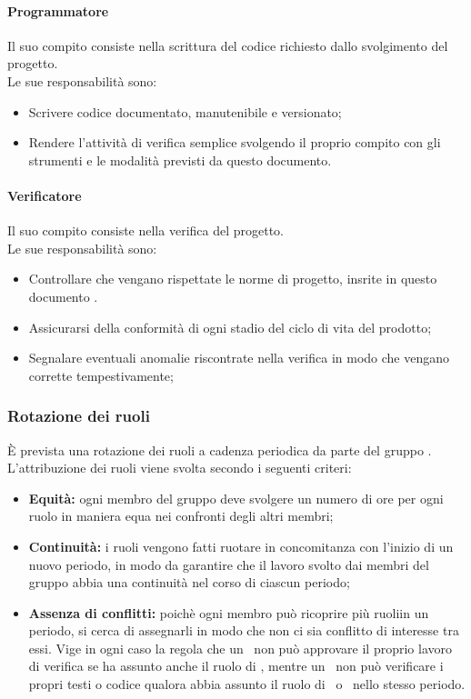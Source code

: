       \paragraph{Programmatore}
        Il suo compito consiste nella scrittura del codice richiesto dallo svolgimento del progetto.\\
        Le sue responsabilità sono:
        \begin{itemize}
          \item Scrivere codice documentato, manutenibile e versionato;
          \item Rendere l'attività di verifica semplice svolgendo il proprio compito con gli strumenti e le modalità previsti da questo documento.
        \end{itemize}

      \paragraph{Verificatore}
        Il suo compito consiste nella verifica del progetto.\\
        Le sue responsabilità sono:
        \begin{itemize}
          \item Controllare che vengano rispettate le norme di progetto, insrite in questo documento \docNameVersionNdP.
          \item Assicurarsi della conformità di ogni stadio del ciclo di vita del prodotto;
          \item Segnalare eventuali anomalie riscontrate nella verifica in modo che vengano corrette tempestivamente;
        \end{itemize}

    \subsubsection{Rotazione dei ruoli}
      È prevista una rotazione dei ruoli a cadenza periodica da parte del gruppo \groupName.\\
      L'attribuzione dei ruoli viene svolta secondo i seguenti criteri:
      \begin{itemize}
        \item \textbf{Equità:} ogni membro del gruppo deve svolgere un numero di ore per ogni ruolo in maniera equa nei confronti degli altri membri;
        \item \textbf{Continuità:} i ruoli vengono fatti ruotare in concomitanza con l'inizio di un nuovo periodo, in modo da garantire che il lavoro svolto dai membri del gruppo abbia una continuità nel corso di ciascun periodo;
        \item \textbf{Assenza di conflitti:} poichè ogni membro può ricoprire più ruoliin un periodo, si cerca di assegnarli in modo che non ci sia conflitto di interesse tra essi. Vige in ogni caso la regola che un \roleProjectManager\ non può approvare il proprio lavoro di verifica se ha assunto anche il ruolo di \roleVerifier, mentre un \roleVerifier\ non può verificare i propri testi o codice qualora abbia assunto il ruolo di \roleAnalyst\ o \roleProgrammer\ nello stesso periodo.
      \end{itemize}


